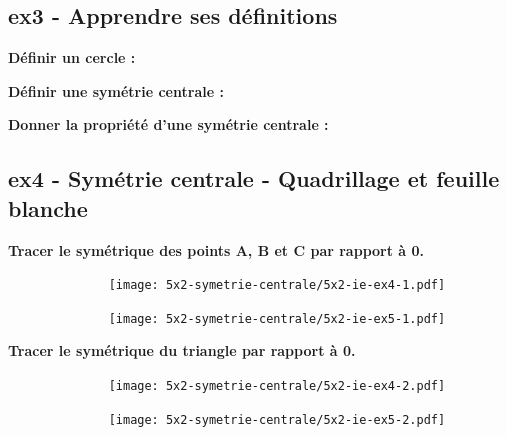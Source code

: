 \documentclass[11pt]{article}
\begin{document}
\subsection*{ex3 - Apprendre ses définitions} 

\textbf{Définir un cercle : } \dotfill \newline
\Pointilles[2]

\textbf{Définir une symétrie centrale : }\dotfill \newline
\Pointilles[2]


\textbf{Donner la propriété d'une symétrie centrale : }\dotfill \newline
\Pointilles[2]


\subsection*{ex4 - Symétrie centrale - Quadrillage et feuille blanche}

\textbf{Tracer le symétrique des points A, B et C par rapport à 0.}

\begin{multicols}{2}

  \begin{figure}[H]
        \centering
        \texttt{[image: 5x2-symetrie-centrale/5x2-ie-ex4-1.pdf]}
  \end{figure}

  \begin{figure}[H]
        \centering
        \texttt{[image: 5x2-symetrie-centrale/5x2-ie-ex5-1.pdf]}
  \end{figure}

\end{multicols}

\textbf{Tracer le symétrique du triangle par rapport à 0.}

\begin{multicols}{2}

  \begin{figure}[H]
        \centering
        \texttt{[image: 5x2-symetrie-centrale/5x2-ie-ex4-2.pdf]}
  \end{figure}

  \begin{figure}[H]
        \centering
        \texttt{[image: 5x2-symetrie-centrale/5x2-ie-ex5-2.pdf]}
  \end{figure}

\end{multicols}
\end{document}
